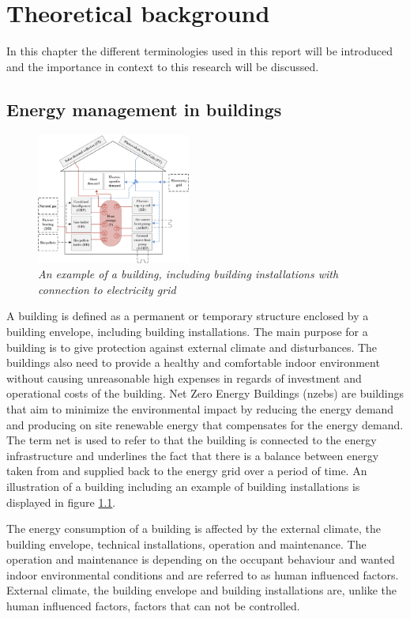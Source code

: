 \chapter{Theoretical background}
In this chapter the different terminologies used in this report will be introduced and the importance in context to this research will be discussed. 

\section{Energy management in buildings}
\begin{figure}
    \centering
    \includegraphics[width=0.45\textwidth]{vedlegg/grid.jpg}
    \caption{\textit{An example of a building, including building installations with connection to electricity grid}}
    \label{fig:gridl}
\end{figure}

A building is defined as a permanent or temporary structure enclosed by a building envelope, including building installations. The main purpose for a building is to give protection against external climate and disturbances. The buildings also need to provide a healthy and comfortable indoor environment without causing unreasonable high expenses in regards of investment and operational costs of the building. Net Zero Energy Buildings (\ac{nzeb}s) are buildings that aim to minimize the environmental impact by reducing the energy demand and producing on site renewable energy that compensates for the energy demand. The term net is used to refer to that the building is connected to the energy infrastructure and underlines the fact that there is a balance between energy taken from and supplied back to the energy grid over a period of time. An illustration of a building including an example of building installations is displayed in figure \ref{fig:gridl}.

The energy consumption of a building is affected by the external climate, the building envelope, technical installations, operation and maintenance. The operation and maintenance is depending on the occupant behaviour and wanted indoor environmental conditions and are referred to as human influenced factors. External climate, the building envelope and building installations are, unlike the human influenced factors, factors that can not be controlled. 
\pagebreak

